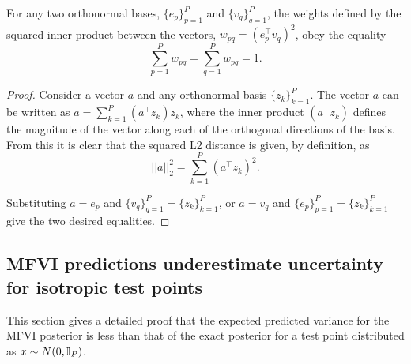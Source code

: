 \begin{lemma} \label{th:w-sum-to-one}
For any two orthonormal bases, $\{e_p\}_{p=1}^P$ and $\{v_q\}_{q=1}^P$, the weights defined  by the squared inner product between the vectors, $w_{pq} = (e_p^\top v_q)^2$, obey the equality
\begin{equation}
    \sum_{p=1}^P w_{pq} = \sum_{q=1}^P w_{pq} = 1 . 
\end{equation}
\end{lemma}
\begin{proof}
    Consider a vector $a$ and any orthonormal basis $\{z_k\}_{k=1}^P$. The vector $a$ can be written as 
    $a = \sum_{k=1}^P (a^\top z_k) z_k $, 
    where the inner product $(a^\top z_k)$ defines the magnitude of the vector along each of the orthogonal directions of the basis.
    From this it is clear that the squared L2 distance is given, by definition, as 
    \begin{equation}
       ||a||^2_2 = \sum_{k=1}^P (a^\top z_k)^2. 
    \end{equation}
    
    Substituting $a = e_p $ and $\{v_q\}_{q=1}^P = \{z_k\}_{k=1}^P$, or $a = v_q $ and $\{e_p\}_{p=1}^P = \{z_k\}_{k=1}^P$ give the two desired equalities. 
\end{proof}


\subsection{MFVI predictions underestimate uncertainty for isotropic test points}
\label{sec:detailed-isotropic}
This section gives a detailed proof that the expected predicted variance for the MFVI posterior is less than that of the exact posterior for a test point distributed as $x\sim N(0, \mathbb{I}_P)$.


